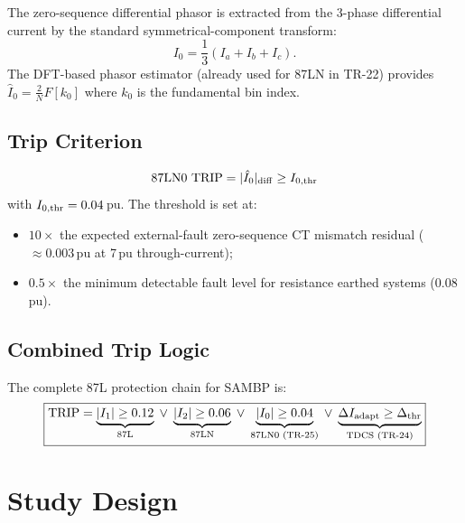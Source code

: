 \documentclass[11pt,a4paper]{article}
\begin{document}
The zero-sequence differential phasor is extracted from the 3-phase
differential current by the standard symmetrical-component transform:
\begin{equation}
  I_0 = \frac{1}{3}(I_a + I_b + I_c).
  \label{eq:I0_extract}
\end{equation}
The DFT-based phasor estimator (already used for 87LN in TR-22) provides
$\hat{I}_0 = \tfrac{2}{N}F[k_0]$ where $k_0$ is the fundamental bin index.

\subsection{Trip Criterion}

\begin{equation}
  \text{87LN0 TRIP} = |\hat{I}_0|_{\rm diff} \geq I_{0,\rm thr}
  \label{eq:87LN0_trip}
\end{equation}
with $I_{0,\rm thr} = 0.04$\,pu.  The threshold is set at:
\begin{itemize}
  \item $10\times$ the expected external-fault zero-sequence CT mismatch
    residual ($\approx 0.003$\,pu at 7\,pu through-current);
  \item $0.5\times$ the minimum detectable fault level for resistance earthed
    systems (0.08\,pu).
\end{itemize}

\subsection{Combined Trip Logic}

The complete 87L protection chain for SAMBP is:
\begin{equation}
  \boxed{
    \text{TRIP} =
    \underbrace{|I_1| \geq 0.12}_{\text{87L}}
    \;\vee\;
    \underbrace{|I_2| \geq 0.06}_{\text{87LN}}
    \;\vee\;
    \underbrace{|I_0| \geq 0.04}_{\text{87LN0 (TR-25)}}
    \;\vee\;
    \underbrace{\Delta I_{\rm adapt} \geq \Delta_{\rm thr}}_{\text{TDCS (TR-24)}}
  }
  \label{eq:full_trip}
\end{equation}

\section{Study Design}
\end{document}
